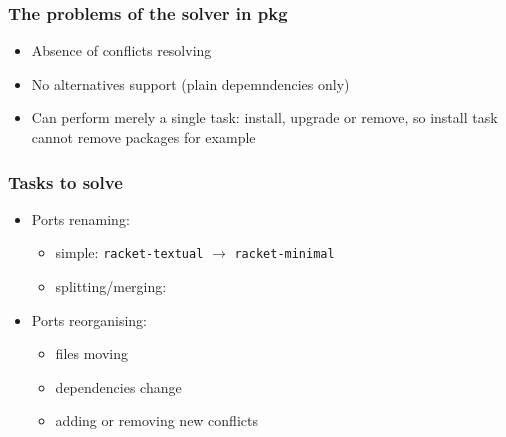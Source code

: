 \documentclass{beamer}
\begin{document}
\begin{frame}
\frametitle{The problems of the solver in pkg}

\begin{itemize}
\item Absence of conflicts resolving
\item No alternatives support (plain depemndencies only)
\item Can perform merely a single task: install, upgrade or remove, 
so install task cannot remove packages for example
\end{itemize}

\end{frame}

\begin{frame}
\frametitle{Tasks to solve}
\begin{itemize}
  \item Ports renaming: 
  \begin{itemize}
    \item simple:
    \texttt{racket-textual} $\rightarrow$ \texttt{racket-minimal}
    \item splitting/merging: 
    \begin{figure}[h!]
	\end{figure}
  \end{itemize}
  \item Ports reorganising:
  	\begin{itemize}
    	\item files moving
    	\item dependencies change
    	\item adding or removing new conflicts
    \end{itemize} 

\end{itemize}
\end{frame}
\end{document}
